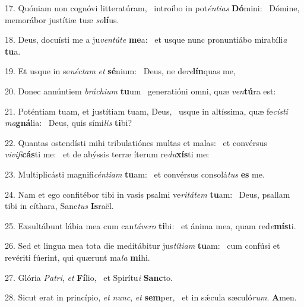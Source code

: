 17. Quóniam non cognóvi litteratúram, \dag\  introíbo in pot\textit{én}\textit{ti}\textit{as} \textbf{Dó}mini: \ast\  Dómine, memorábor justítiæ tuæ \textit{so}\textbf{lí}us.\

18. Deus, docuísti me a ju\textit{ven}\textit{tú}\textit{te} \textbf{me}a: \ast\  et usque nunc pronuntiábo mirabíli\textit{a} \textbf{tu}a.\

19. Et usque in se\textit{néc}\textit{tam} \textit{et} \textbf{sé}nium: \ast\  Deus, ne de\textit{re}\textbf{lín}quas me,\

20. Donec annúntiem \textit{brá}\textit{chi}\textit{um} \textbf{tu}um \ast\  generatióni omni, quæ \textit{ven}\textbf{tú}ra est:\

21. Poténtiam tuam, et justítiam tuam, Deus, \dag\  usque in altíssima, quæ fe\textit{cís}\textit{ti} \textit{ma}\textbf{gná}lia: \ast\  Deus, quis sími\textit{lis} \textbf{ti}bi?\

22. Quantas ostendísti mihi tribulatiónes multas et malas: \dag\  et convérsus \textit{vi}\textit{vi}\textit{fi}\textbf{cás}ti me: \ast\  et de abýssis terræ íterum re\textit{du}\textbf{xís}ti me:\

23. Multiplicásti magnifi\textit{cén}\textit{ti}\textit{am} \textbf{tu}am: \ast\  et convérsus consolá\textit{tus} \textbf{es} me.\

24. Nam et ego confitébor tibi in vasis psalmi ve\textit{ri}\textit{tá}\textit{tem} \textbf{tu}am: \ast\  Deus, psallam tibi in cíthara, Sanc\textit{tus} \textbf{Is}raël.\

25. Exsultábunt lábia mea cum can\textit{tá}\textit{ve}\textit{ro} \textbf{ti}bi: \ast\  et ánima mea, quam red\textit{e}\textbf{mís}ti.\

26. Sed et lingua mea tota die meditábitur jus\textit{tí}\textit{ti}\textit{am} \textbf{tu}am: \ast\  cum confúsi et revériti fúerint, qui quærunt ma\textit{la} \textbf{mi}hi.\

27. Glória \textit{Pa}\textit{tri}, \textit{et} \textbf{Fí}lio, \ast\  et Spirítu\textit{i} \textbf{Sanc}to.\

28. Sicut erat in princípio, \textit{et} \textit{nunc}, \textit{et} \textbf{sem}per, \ast\  et in sǽcula sæculó\textit{rum}. \textbf{A}men.\

